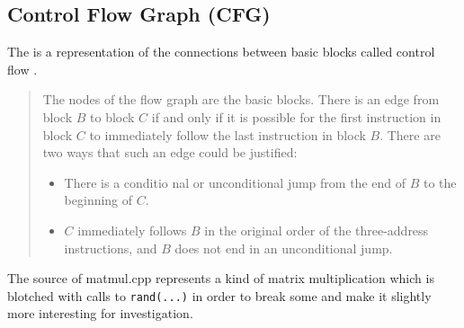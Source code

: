\subsection{Control Flow Graph (CFG)}\label{subsec:cfg}
The \cfg is a representation of the connections between basic blocks called control flow \cite[chapter 8.4.3, p.~529]{Drachenbuch}.

\begin{quotation}
    The nodes of the flow graph are the basic blocks.
    There is an edge from block \(B\) to block \(C\) if and only if it is possible for the first instruction in block \(C\) to immediately follow the last instruction in block \(B\).
    There are two ways that such an edge could be justified:
    \begin{itemize}
        \item There is a conditio nal or unconditional jump from the end of \(B\) to the beginning of \(C\).
        \item \(C\) immediately follows \(B\) in the original order of the three-address instructions, and \(B\) does not end in an unconditional jump.
    \end{itemize}
\end{quotation}
\begin{code}
    \caption[Source of matmul.cpp]{The source of matmul.cpp represents a kind of matrix multiplication which is blotched with calls to \texttt{rand(...)} in order to break some \scops and make it slightly more interesting for investigation.}
    \inputminted{c++}{cpp/matmul.cpp}
    \label{lst:matmulcpp}
\end{code}
